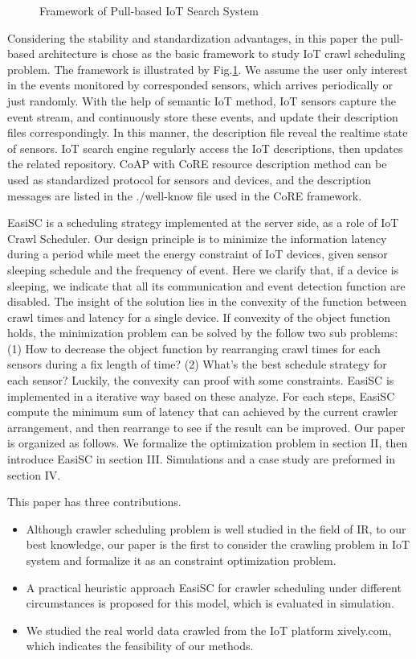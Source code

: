 \documentclass[conference]{IEEEtran}
\begin{document}
\begin{figure}
	\centering
	
	\captionsetup{justification=centering}
	\caption{Framework of Pull-based IoT Search System}
	\label{fig:framework}
\end{figure}
Considering the stability and standardization advantages, in this paper the pull-based architecture is chose as the basic framework to study IoT crawl scheduling problem. The framework is illustrated by Fig.\ref{fig:framework}. 
We assume the user only interest in the events monitored by corresponded sensors, which arrives periodically or just randomly. With the help of semantic IoT method, IoT sensors capture the event stream, and continuously store these events, and update their description files correspondingly. In this manner, the description file reveal the realtime state of sensors. IoT search engine regularly access the IoT descriptions, then updates the related repository. CoAP with CoRE resource description method can be used as standardized protocol for sensors and devices, and the description messages are listed in the ./well-know file used in the CoRE framework. 


EasiSC is a scheduling strategy implemented at the server side, as a role of IoT Crawl Scheduler. Our design principle is to minimize the information latency during  a period while meet the energy constraint of IoT devices, given sensor sleeping schedule and the frequency of event. Here we clarify that, if a device is sleeping, we indicate that all its communication and event detection function are disabled.
The insight of the solution lies in the convexity of the function between crawl times and latency for a single device. If convexity of the object function holds, the minimization problem can be solved by the follow two sub problems: (1) How to decrease the object function by rearranging crawl times for each sensors during a fix length of time? (2) What's the best schedule strategy for each sensor? Luckily, the convexity can proof with some constraints. EasiSC is implemented in a iterative way based on these analyze. For each steps, EasiSC compute the minimum sum of latency that can achieved by the current crawler arrangement, and then rearrange to see if the result can be improved.
Our paper is organized as follows. We formalize the optimization problem in section II, then introduce EasiSC in section III. Simulations and a case study are preformed in section IV. 

This paper has three contributions.
\begin{itemize}
\item Although crawler scheduling problem is well studied in the field of IR, to our best knowledge, our paper is the first to consider the crawling problem in IoT system and formalize it as an constraint optimization problem.
\item A practical heuristic approach EasiSC for crawler scheduling under different circumstances is proposed for this model, which is evaluated in simulation.
\item We studied the real world data crawled from the IoT platform xively.com, which indicates the feasibility of our methods.
\end{itemize}
\end{document}
